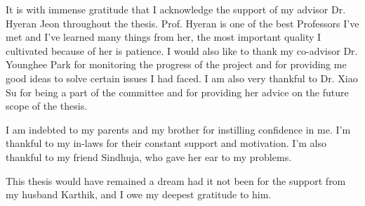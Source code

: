 It is with immense gratitude that I acknowledge the support of my advisor Dr. Hyeran Jeon throughout the thesis. Prof. Hyeran is one of the best Professors I've met and I've learned many things from her, the most important quality I cultivated because of her is patience.  I would also like to thank my co-advisor Dr. Younghee Park for monitoring the progress of the project and for providing me good ideas to solve certain issues I had faced.  I am also very thankful to Dr. Xiao Su for being a part of the committee and for providing her advice on the future scope of the thesis.

I am indebted to my parents and my brother for instilling confidence in me.  I'm thankful to my in-laws for their constant support and motivation.  I'm also thankful to my friend Sindhuja, who gave her ear to my problems.

This thesis would have remained a dream had it not been for the support from my husband Karthik, and I owe my deepest gratitude to him. 
